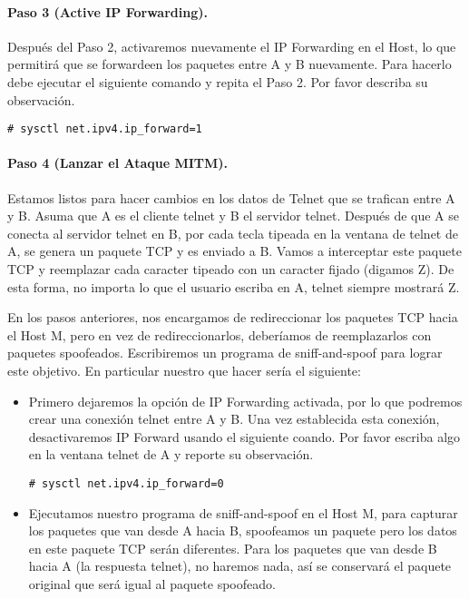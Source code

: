 \paragraph{Paso 3 (Active IP Forwarding).} Después del Paso 2, activaremos nuevamente el IP Forwarding en el Host, lo que permitirá que se forwardeen los paquetes entre A y B nuevamente. Para hacerlo debe ejecutar el siguiente comando y repita el Paso 2.
Por favor describa su observación.

\begin{lstlisting}
# sysctl net.ipv4.ip_forward=1
\end{lstlisting}

\paragraph{Paso 4 (Lanzar el Ataque MITM).} Estamos listos para hacer cambios en los datos de Telnet que se trafican entre A y B. Asuma que A es el cliente telnet y B el servidor telnet. Después de que A se conecta al servidor telnet en B, por cada tecla tipeada en la ventana de telnet de A, se genera un paquete TCP y es enviado a B. Vamos a interceptar este paquete TCP y reemplazar cada caracter tipeado con un caracter fijado (digamos Z). De esta forma, no importa lo que el usuario escriba en A, telnet siempre mostrará Z.

En los pasos anteriores, nos encargamos de redireccionar los paquetes TCP hacia el Host M, pero en vez de redireccionarlos, deberíamos de reemplazarlos con paquetes spoofeados. Escribiremos un programa de sniff-and-spoof para lograr este objetivo. 
En particular nuestro que hacer sería el siguiente:


\begin{itemize}

\item Primero dejaremos la opción de IP Forwarding activada, por lo que podremos crear una conexión telnet entre A y B. Una vez establecida esta conexión, desactivaremos IP Forward usando el siguiente coando. Por favor escriba algo en la ventana telnet de A y reporte su observación.

\begin{lstlisting}
# sysctl net.ipv4.ip_forward=0
\end{lstlisting}

\item Ejecutamos nuestro programa de sniff-and-spoof en el Host M, para capturar los paquetes que van desde A hacia B, spoofeamos un paquete pero los datos en este paquete TCP serán diferentes. Para los paquetes que van desde B hacia A (la respuesta telnet), no haremos nada, así se conservará el paquete original que será igual al paquete spoofeado.

\end{itemize} 


